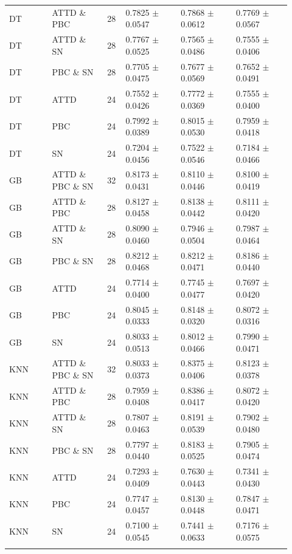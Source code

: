 \documentclass[10pt,a4paper]{article}
\newcommand{\classifiersep}{\addlinespace[1pt]\midrule\addlinespace[1pt]}
\begin{document}
\begin{landscape}
\begin{longtable}{@{}L{0.14\linewidth}L{0.18\linewidth}C{0.06\linewidth}C{0.18\linewidth}C{0.18\linewidth}C{0.18\linewidth}@{}}
DT & ATTD \& PBC & 28 & 0.7825 $\pm$ 0.0547 & 0.7868 $\pm$ 0.0612 & 0.7769 $\pm$ 0.0567 \\
DT & ATTD \& SN & 28 & 0.7767 $\pm$ 0.0525 & 0.7565 $\pm$ 0.0486 & 0.7555 $\pm$ 0.0406 \\
DT & PBC \& SN & 28 & 0.7705 $\pm$ 0.0475 & 0.7677 $\pm$ 0.0569 & 0.7652 $\pm$ 0.0491 \\
DT & ATTD & 24 & 0.7552 $\pm$ 0.0426 & 0.7772 $\pm$ 0.0369 & 0.7555 $\pm$ 0.0400 \\
DT & PBC & 24 & 0.7992 $\pm$ 0.0389 & 0.8015 $\pm$ 0.0530 & 0.7959 $\pm$ 0.0418 \\
DT & SN & 24 & 0.7204 $\pm$ 0.0456 & 0.7522 $\pm$ 0.0546 & 0.7184 $\pm$ 0.0466 \\
\classifiersep
GB & ATTD \& PBC \& SN & 32 & 0.8173 $\pm$ 0.0431 & 0.8110 $\pm$ 0.0446 & 0.8100 $\pm$ 0.0419 \\
GB & ATTD \& PBC & 28 & 0.8127 $\pm$ 0.0458 & 0.8138 $\pm$ 0.0442 & 0.8111 $\pm$ 0.0420 \\
GB & ATTD \& SN & 28 & 0.8090 $\pm$ 0.0460 & 0.7946 $\pm$ 0.0504 & 0.7987 $\pm$ 0.0464 \\
GB & PBC \& SN & 28 & 0.8212 $\pm$ 0.0468 & 0.8212 $\pm$ 0.0471 & 0.8186 $\pm$ 0.0440 \\
GB & ATTD & 24 & 0.7714 $\pm$ 0.0400 & 0.7745 $\pm$ 0.0477 & 0.7697 $\pm$ 0.0420 \\
GB & PBC & 24 & 0.8045 $\pm$ 0.0333 & 0.8148 $\pm$ 0.0320 & 0.8072 $\pm$ 0.0316 \\
GB & SN & 24 & 0.8033 $\pm$ 0.0513 & 0.8012 $\pm$ 0.0466 & 0.7990 $\pm$ 0.0471 \\
\classifiersep
KNN & ATTD \& PBC \& SN & 32 & 0.8033 $\pm$ 0.0373 & 0.8375 $\pm$ 0.0406 & 0.8123 $\pm$ 0.0378 \\
KNN & ATTD \& PBC & 28 & 0.7959 $\pm$ 0.0408 & 0.8386 $\pm$ 0.0417 & 0.8072 $\pm$ 0.0420 \\
KNN & ATTD \& SN & 28 & 0.7807 $\pm$ 0.0463 & 0.8191 $\pm$ 0.0539 & 0.7902 $\pm$ 0.0480 \\
KNN & PBC \& SN & 28 & 0.7797 $\pm$ 0.0440 & 0.8183 $\pm$ 0.0525 & 0.7905 $\pm$ 0.0474 \\
KNN & ATTD & 24 & 0.7293 $\pm$ 0.0409 & 0.7630 $\pm$ 0.0443 & 0.7341 $\pm$ 0.0430 \\
KNN & PBC & 24 & 0.7747 $\pm$ 0.0457 & 0.8130 $\pm$ 0.0448 & 0.7847 $\pm$ 0.0471 \\
KNN & SN & 24 & 0.7100 $\pm$ 0.0545 & 0.7441 $\pm$ 0.0633 & 0.7176 $\pm$ 0.0575 \\
\classifiersep

\end{longtable}
\end{landscape}
\end{document}
